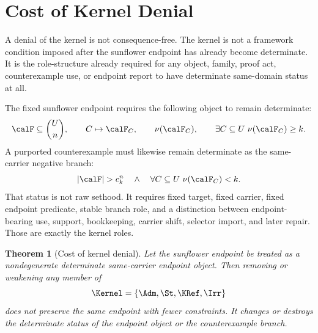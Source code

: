 \documentclass[11pt]{article}
\newtheorem{theorem}{Theorem}[section]
\begin{document}
\section{Cost of Kernel Denial}

A denial of the kernel is not consequence-free.  The kernel is not a framework condition imposed after the sunflower endpoint has already become determinate.  It is the role-structure already required for any object, family, proof act, counterexample use, or endpoint report to have determinate same-domain status at all.

The fixed sunflower endpoint requires the following object to remain determinate:
\[
  \calF\subseteq\binom{U}{n},\qquad
  C\mapsto \calF_C,\qquad
  \nu(\calF_C),\qquad
  \exists C\subseteq U\ \nu(\calF_C)\ge k.
\]
A purported counterexample must likewise remain determinate as the same-carrier negative branch:
\[
  |\calF|>c_k^n
  \quad\wedge\quad
  \forall C\subseteq U\ \nu(\calF_C)<k.
\]
That status is not raw sethood.  It requires fixed target, fixed carrier, fixed endpoint predicate, stable branch role, and a distinction between endpoint-bearing use, support, bookkeeping, carrier shift, selector import, and later repair.  Those are exactly the kernel roles.

\begin{theorem}[Cost of kernel denial]\label{thm:cost-kernel-denial}
Let the sunflower endpoint be treated as a nondegenerate determinate same-carrier endpoint object.  Then removing or weakening any member of
\[
  \Kernel=\{\Adm,\St,\KRef,\Irr\}
\]
does not preserve the same endpoint with fewer constraints.  It changes or destroys the determinate status of the endpoint object or the counterexample branch.
\end{theorem}
\end{document}
